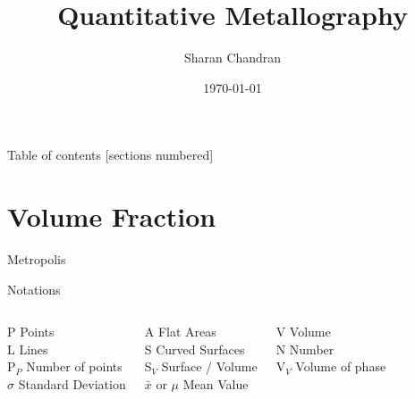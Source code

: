 \documentclass[10pt]{beamer}
\title{Quantitative Metallography}
\date{\today}
\author{Sharan Chandran}
\institute{Indian Institute of Science}
\begin{document}
\graphicspath{{../Images/}} 

\maketitle

\begin{frame}{Table of contents}
  [sections numbered]
  \tableofcontents[hideallsubsections]
\end{frame}

\section{Volume Fraction}

\begin{frame}[fragile]{Metropolis}


\end{frame}


\begin{frame}{Notations}


  \begin{columns}[T,onlytextwidth]
    P Points \\
    L Lines  \\
    P$ _{P} $ Number of points \\
    $\sigma$ Standard Deviation
 
   A Flat Areas \\
   S Curved Surfaces \\
   S$ _{V} $ Surface / Volume \\
   $\bar{x}$ or $\mu$ Mean Value
  
    V Volume \\
    N Number \\
    V$ _{V} $ Volume of phase
\end{columns}     

\end{frame}
\end{document}
